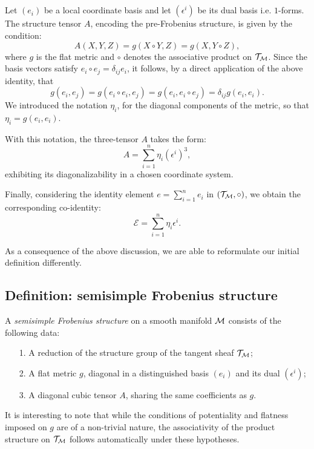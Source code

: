 \subsection{}
Let $(e_i)$ be a local coordinate basis and let $(\epsilon^i)$ be its dual basis i.e. $1$-forms. 
The structure tensor $A$, encoding the pre-Frobenius structure, is given by the condition:
\[
A(X, Y, Z) = g(X \circ Y, Z) = g(X, Y \circ Z),
\]
where $g$ is the flat metric and 
$\circ$ denotes the associative product on $\mathcal{T}_{\mathcal{M}}$.
Since the basis vectors satisfy $e_i \circ e_j = \delta_{ij} e_i$, it follows, by a direct application of the above identity, that
\[
g(e_i, e_j) = g(e_i \circ e_i, e_j) = g(e_i, e_i \circ e_j) = \delta_{ij} g(e_i, e_i).
\]
We introduced the notation $\eta_i$, for the diagonal components of the metric,
so that $\eta_i=g(e_i, e_i)$. 

With this notation, the three-tensor $A$ takes the form:
\[
A = \sum_{i=1}^n \eta_i (\epsilon^i)^3,
\]
exhibiting its  diagonalizability in a chosen coordinate system.

Finally, considering the identity element $e = \sum_{i=1}^n e_i$ in $(\mathcal{T}_{\mathcal{M}}, \circ)$, we obtain the corresponding co-identity:
\[
\mathcal{E} = \sum_{i=1}^n \eta_i \epsilon^i.
\]

As a consequence of the above discussion, we are able to reformulate our initial definition differently. 
\subsection{Definition: semisimple Frobenius structure}
\begin{definition}
A \emph{semisimple Frobenius structure} on a smooth manifold  $\mathcal{M}$ consists of the following data:
\begin{itemize}
    \item[1.] A reduction of the structure group of the tangent sheaf $\mathcal{T}_{\mathcal{M}}$;
    \item[2.] A flat metric $g$, diagonal in a distinguished  basis $(e_i)$ and its dual $(\epsilon^i)$;
    \item[3.] A diagonal cubic tensor $A$, sharing the same coefficients as $g$.
\end{itemize}
\end{definition}
\begin{remark} It is interesting to note that while the conditions of potentiality and flatness imposed on 
$g$ are of a non-trivial nature,  the associativity of the product structure on $\mathcal{T}_{\mathcal{M}}$ follows automatically under these hypotheses.
\end{remark}

